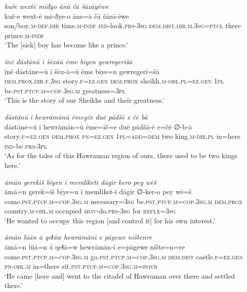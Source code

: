 \ea \label{DG.70}
\textit{kuře wextē miđyo ānā čā šāzāyēwe} \\ 
\gll kuř-e wext-ē mi-đye-o āne=ā čā šāzā-ēwe \\ 
 son/boy\textsc{.m}\textsc{-def}\textsc{.dir} time\textsc{.m}\textsc{-indf} \textsc{ind-}look\textsc{.prs}\textsc{-3sg} \textsc{dem.dist}\textsc{.dir}\textsc{.m}\textsc{.3sg}=\textsc{ptcl} there prince\textsc{.m}\textsc{-indf} \\ 
\glt `The [sick] boy has become like a prince.'
\z 
 
\ea \label{DG.73}
\textit{īnē dāstānū ī šēxāū ēme bīyen gewregerīšā} \\ 
\gll īnē dāstāne=ū ī šēx-ā=ū ēme bīye=n gewregerī=šā \\ 
 \textsc{dem.prox}\textsc{.dir}\textsc{\textsc{.f}}\textsc{.3sg} story\textsc{\textsc{.f}}\textsc{=ez}\textsc{.gen} \textsc{dem.prox} sheikh\textsc{.m}\textsc{-obl}\textsc{.pl}=\textsc{ez.gen} \textsc{1pl} be\textsc{.pst}\textsc{.ptcp}\textsc{.m}\textsc{=cop}\textsc{.3sg}\textsc{.m} greatness\textsc{=3pl} \\ 
\glt `This is the story of our Sheikhs and their greatness.'
\z 
 

\ea \label{DP.1}
\textit{dāstānū ī hewrāmānū ēmeyče duē pādšē e čē bā} \\ 
\gll dāstāne=ū ī hewrāmān=ū ēme=īč=e duē pādšā-ē e=čē ∅-b-ā \\ 
 story\textsc{\textsc{.f}}\textsc{=ez}\textsc{.gen} \textsc{dem.prox} \textsc{pn}\textsc{=ez}\textsc{.gen} \textsc{1pl}\textsc{=add}\textsc{=dem} two king\textsc{.m}\textsc{-dir}\textsc{.pl} in=here \textsc{ind-}be\textsc{.prs}\textsc{-3pl} \\ 
\glt `As for the tales of this Hawraman region of ours, there used to be two kings here.'
\z 
 
\ea \label{DP.5}
\textit{āmān gerekiš bīyen ī memliketī dāgīr kero pey wēš} \\ 
\gll āmā=n gerek=iš bīye=n ī memliket-ī dāgīr ∅-ker-o pey wē=š \\ 
 come\textsc{.pst}\textsc{.ptcp}\textsc{.m}\textsc{=cop}\textsc{.3sg}\textsc{.m} necessary\textsc{=3sg} be\textsc{.pst}\textsc{.ptcp}\textsc{.m}\textsc{=cop}\textsc{.3sg}\textsc{.m} \textsc{dem.prox} country\textsc{.m}\textsc{-obl}\textsc{.m} occupied \textsc{sbjv-}do\textsc{.prs}\textsc{-3sg} for \textsc{reflx}\textsc{=3sg} \\ 
\glt `He wanted to occupy this region [and control it] for his own interest.'
\z 
 
\ea \label{DP.9}
\textit{āmān lūān ā qeɫāw hewrāmānī e pāgewe nīštenre} \\ 
\gll āmā=n lūā=n ā qeɫā=w hewrāmān-ī e=pāgewe nīšte=n=re \\ 
 come\textsc{.pst}\textsc{.ptcp}\textsc{.m}\textsc{=cop}\textsc{.3sg}\textsc{.m} go\textsc{.pst}\textsc{.ptcp}\textsc{.m}\textsc{=cop}\textsc{.3sg}\textsc{.m} \textsc{dem.dist} castle\textsc{\textsc{.f}}\textsc{=ez}\textsc{.gen} \textsc{pn}\textsc{-obl}\textsc{.m} in=there sit\textsc{.pst}\textsc{.ptcp}\textsc{.m}\textsc{=cop}\textsc{.3sg}\textsc{.m}\textsc{=\textsc{povb}} \\ 
\glt `He came [here and] went to the citadel of Hawraman over there and settled there.'
\z 
 
